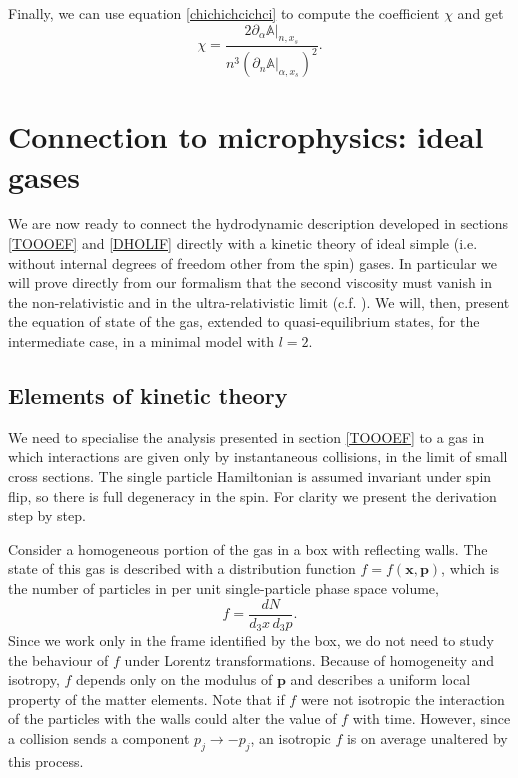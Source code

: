 \documentclass[useAMS,usenatbib,prd,twocolumn,nofootinbib]{revtex4-1}
\newcommand{\vect}[1]{\mathbf{{#1}}}
\begin{document}
Finally, we can use equation \eqref{chichichcichci} to compute the coefficient $\chi$ and get
\begin{equation}
\chi = \dfrac{2 \partial_\alpha \mathbb{A}|_{n,x_s}}{n^3 (\partial_n \mathbb{A}|_{\alpha,x_s})^2}.
\end{equation}




\section{Connection to microphysics: ideal gases}\label{abcdefghi}

We are now ready to connect the hydrodynamic description developed in sections \ref{TOOOEF} and \ref{DHOLIF} directly with a kinetic theory of ideal simple (i.e. without internal degrees of freedom other from the spin) gases. In particular we will prove directly from our formalism that the second viscosity must vanish in the non-relativistic and in the ultra-relativistic limit (c.f. \cite{landau10}). We will, then, present the equation of state of the gas, extended to quasi-equilibrium states, for the intermediate case, in a minimal model with $l=2$.

\subsection{Elements of kinetic theory}\label{ottopuntouno}

We need to specialise the analysis presented in section \ref{TOOOEF} to a gas in which interactions are given only by instantaneous collisions, in the limit of small cross sections. The single particle Hamiltonian is assumed invariant under spin flip, so there is full degeneracy in the spin. 
For clarity we  present the derivation step by step. 

Consider a homogeneous portion of the gas in a box with reflecting walls. 
The state of this gas is described with a distribution function $f=f(\vect{x},\vect{p})$, which is the number of particles in per unit single-particle phase space volume,
\begin{equation}
f = \dfrac{dN}{d_3 x \, d_3 p}.
\end{equation}
Since we work only in the frame identified by the box, we do not need to study the behaviour of $f$ under Lorentz transformations. Because of homogeneity and isotropy, $f$ depends only on the modulus of $\vect{p}$ and describes a uniform local property of the matter elements. 
Note that if $f$ were not isotropic the interaction of the particles with the walls could alter the value of $f$ with time. However, since a collision sends a component $p_j \rightarrow -p_j$, an isotropic $f$ is on average unaltered by this process.
\end{document}
